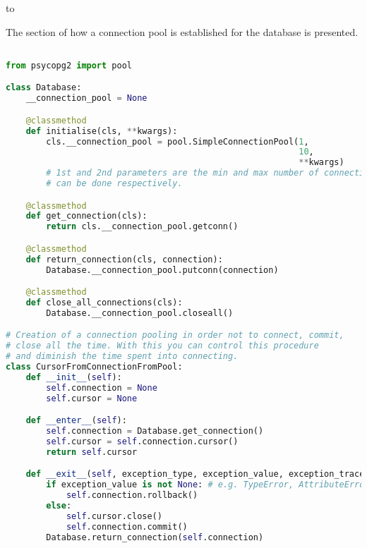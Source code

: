 \documentclass[12pt,a4paper,notitlepage,oneside,openright]{report}
\begin{document}
\def\dashfill{\cleaders\hbox{-}\hfill}
\hbox to \hsize{\dashfill\hfil}

The section of how a connection pool is established for the database is presented.
\begin{center}
\begin{lstlisting}[language=Python, formfeed=\newpage, extendedchars=true] 

from psycopg2 import pool

class Database:
    __connection_pool = None

    @classmethod
    def initialise(cls, **kwargs):
        cls.__connection_pool = pool.SimpleConnectionPool(1,
                                                          10,
                                                          **kwargs)
        # 1st and 2nd parameters are the min and max number of connections that
        # can be done respectively.

    @classmethod
    def get_connection(cls):
        return cls.__connection_pool.getconn()

    @classmethod
    def return_connection(cls, connection):
        Database.__connection_pool.putconn(connection)

    @classmethod
    def close_all_connections(cls):
        Database.__connection_pool.closeall()

# Creation of a connection pooling in order not to connect, commit,
# close all the time. With this you can control this procedure
# and diminish the time spent into connecting.
class CursorFromConnectionFromPool:
    def __init__(self):
        self.connection = None
        self.cursor = None

    def __enter__(self):
        self.connection = Database.get_connection()
        self.cursor = self.connection.cursor()
        return self.cursor

    def __exit__(self, exception_type, exception_value, exception_traceback):
        if exception_value is not None: # e.g. TypeError, AttributeError, ValueError
            self.connection.rollback()
        else:
            self.cursor.close()
            self.connection.commit()
        Database.return_connection(self.connection)
\end{lstlisting}
\end{center}
\end{document}
